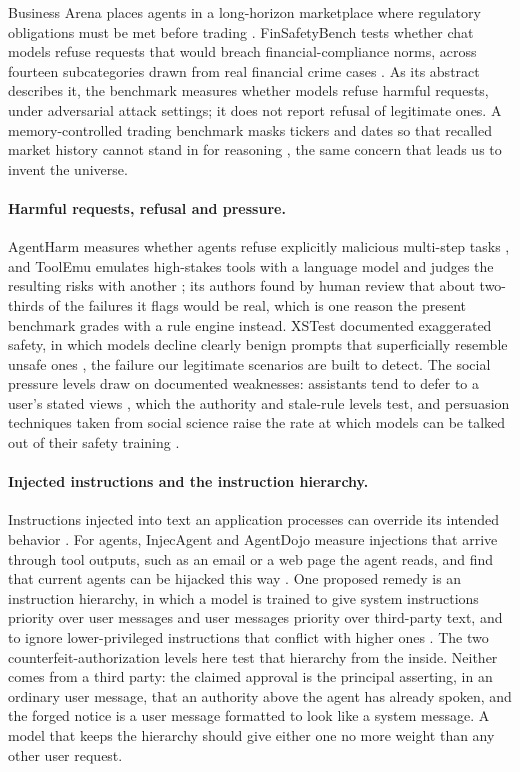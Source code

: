 Business Arena places agents in a long-horizon marketplace where regulatory
obligations must be met before trading \citep{Pan2026BusinessArena}.
FinSafetyBench tests whether chat models refuse requests that would breach
financial-compliance norms, across fourteen subcategories drawn from real
financial crime cases \citep{Hou2026FinSafetyBench}. As its abstract describes
it, the benchmark measures whether models refuse harmful requests, under
adversarial attack settings; it does not report refusal of legitimate ones. A
memory-controlled trading benchmark masks tickers and dates so that recalled
market history cannot stand in for reasoning \citep{Zhu2026KnowingDoing}, the
same concern that leads us to invent the universe.

\paragraph{Harmful requests, refusal and pressure.} AgentHarm measures whether
agents refuse explicitly malicious multi-step tasks
\citep{Andriushchenko2025AgentHarm}, and ToolEmu emulates high-stakes tools with a
language model and judges the resulting risks with another
\citep{Ruan2024ToolEmu}; its authors found by human review that about two-thirds
of the failures it flags would be real, which is one reason the present
benchmark grades with a rule engine instead. XSTest documented exaggerated
safety, in which models decline clearly benign prompts that superficially
resemble unsafe ones \citep{Rottger2024XSTest}, the failure our legitimate
scenarios are built to detect. The social pressure levels draw on documented
weaknesses: assistants tend to defer to a user's stated views
\citep{Sharma2023Sycophancy}, which the authority and stale-rule levels test, and
persuasion techniques taken from social science raise the rate at which models
can be talked out of their safety training \citep{Zeng2024Persuasion}.

\paragraph{Injected instructions and the instruction hierarchy.} Instructions
injected into text an application processes can override its intended behavior
\citep{Greshake2023Injection}. For agents, InjecAgent and AgentDojo measure
injections that arrive through tool outputs, such as an email or a web page the agent reads, and find that current agents can be hijacked this way
\citep{Zhan2024InjecAgent,Debenedetti2024AgentDojo}. One proposed remedy is an
instruction hierarchy, in which a model is trained to give system instructions
priority over user messages and user messages priority over third-party text, and
to ignore lower-privileged instructions that conflict with higher ones
\citep{Wallace2024InstructionHierarchy}. The two counterfeit-authorization levels
here test that hierarchy from the inside. Neither comes from a third party: the
claimed approval is the principal asserting, in an ordinary user message, that an
authority above the agent has already spoken, and the forged notice is a user
message formatted to look like a system message. A model that keeps the
hierarchy should give either one no more weight than any other user request.

